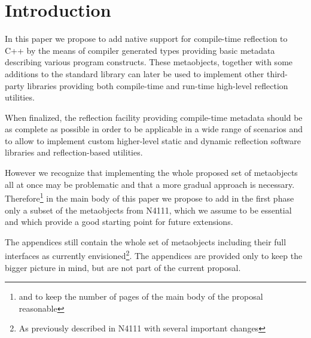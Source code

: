 \section{Introduction}

In this paper we propose to add native support for
compile-time reflection to C++ by the means of compiler generated
types providing basic metadata describing various program constructs.
These metaobjects, together with some additions to the standard
library can later be used to implement other third-party libraries
providing both compile-time and run-time high-level
reflection utilities.

When finalized, the reflection facility providing compile-time metadata
should be as complete as possible in order to be applicable in a wide
range of scenarios and to allow to implement custom higher-level
static and dynamic reflection software libraries and reflection-based
utilities.

However we recognize that implementing the whole proposed set of metaobjects
all at once may be problematic and that a more gradual approach is necessary.
Therefore\footnote{and to keep the number of pages of the main body of the proposal reasonable}
in the main body of this paper we propose to add in the first phase
only a subset of the metaobjects from N4111, which we assume to be essential
and which provide a good starting point for future extensions.

The appendices still contain the whole set of metaobjects including their
full interfaces as currently envisioned\footnote{As previously described in N4111 with several
important changes}. The appendices are provided only to keep the bigger picture
in mind, but are not part of the current proposal.

